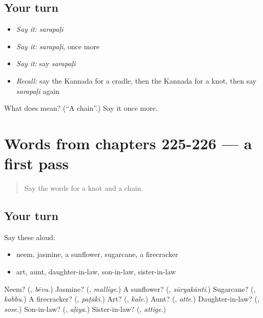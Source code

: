 \subsection*{Your turn}
\begin{itemize}
\raggedright
  \item \emph{Say it:} \emph{sarapaḷi}
  \item \emph{Say it:} \emph{sarapaḷi}, once more
  \item \emph{Say it:} say \emph{sarapaḷi}
  \item \emph{Recall:} say the Kannada for a cradle, then the Kannada for a knot, then say \emph{sarapaḷi} again
\end{itemize}

\begin{tcolorbox}[breakable,colback=teal!4,colframe=teal!35!black,title={Before you move on}]
What does  mean? (\textquotedblleft{}A chain\textquotedblright{}.) Say it once more.
\end{tcolorbox}
\section[(dialogue)]{Words from chapters 225-226 — a first pass}

\label{lesson:KA-R229-first-pass-words-from-chapters-225-226}



\begin{quote}
Say the words for a knot and a chain.
\end{quote}

\subsection*{Your turn}
Say these aloud:

\begin{itemize}
\raggedright
  \item neem, jasmine, a sunflower, sugarcane, a firecracker
  \item art, aunt, daughter-in-law, son-in-law, sister-in-law
\end{itemize}

\begin{tcolorbox}[breakable,colback=teal!4,colframe=teal!35!black,title={Before you move on}]
Neem? (\textbf{}, \emph{bēvu}.) Jasmine? (\textbf{}, \emph{mallige}.) A sunflower? (\textbf{}, \emph{sūryakānti}.) Sugarcane? (\textbf{}, \emph{kabbu}.) A firecracker? (\textbf{}, \emph{paṭāki}.) Art? (\textbf{}, \emph{kale}.) Aunt? (\textbf{}, \emph{atte}.) Daughter-in-law? (\textbf{}, \emph{sose}.) Son-in-law? (\textbf{}, \emph{aḷiya}.) Sister-in-law? (\textbf{}, \emph{attige}.)
\end{tcolorbox}
